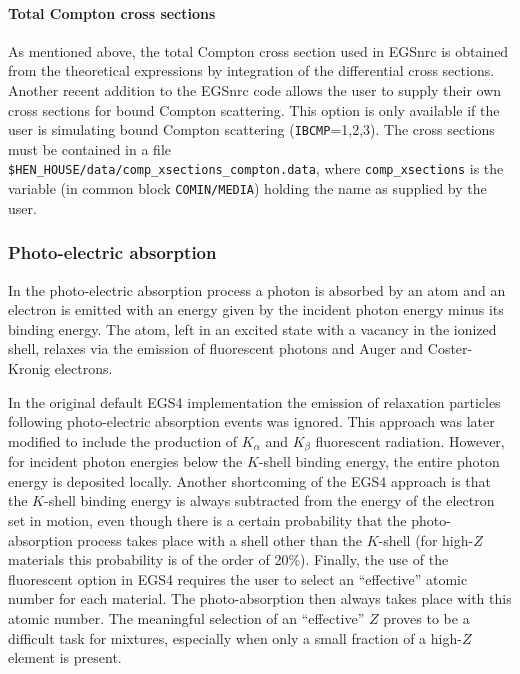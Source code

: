 \paragraph{Total Compton cross sections}\hfill
\label{comp_xsect}

As mentioned above, the total Compton cross section used in EGSnrc is obtained
from the theoretical expressions by integration of the differential cross sections.
Another recent addition to the EGSnrc code allows the user to supply their
own cross sections for bound Compton scattering. This option is only available
if the user is simulating bound Compton scattering
({\tt IBCMP}=1,2,3).  The cross sections
must be contained in a file\\
 {\tt \$HEN\_HOUSE/data/comp\_xsections\_compton.data},
where {\tt comp\_xsections} is the variable
(in common block {\tt COMIN/MEDIA}) holding the name as supplied
by the user.

\subsubsection{Photo-electric absorption}
\setcounter{equation}{0}
\label{photo}

In the photo-electric absorption process a photon is
absorbed by an atom and an electron
is emitted with an energy given by the incident photon
energy minus its binding energy.
The atom, left in an excited state with a vacancy in the
ionized shell, relaxes via the emission of fluorescent photons and
Auger and Coster-Kronig electrons.

In the original default EGS4 implementation the emission of relaxation
particles following photo-electric absorption events was
ignored. This approach was later modified
to include the production of $K_\alpha$ and $K_\beta$ fluorescent
radiation. However, for incident photon energies below
the $K$-shell binding energy, the entire photon energy is
deposited locally. Another shortcoming of the EGS4 approach is
that the $K$-shell binding energy is always subtracted
from the energy of the electron set in motion, even though there
is a certain probability that the photo-absorption process
takes place with a shell other than the $K$-shell (for
high-$Z$ materials this probability is of the order of 20\%).
Finally, the use of the fluorescent option in EGS4 requires
the user to select an ``effective'' atomic number for each
material. The photo-absorption then always takes place with
this atomic number. The meaningful selection of an
``effective'' $Z$ proves to be a difficult task for mixtures, especially
when only a small fraction of a high-$Z$ element is present.

